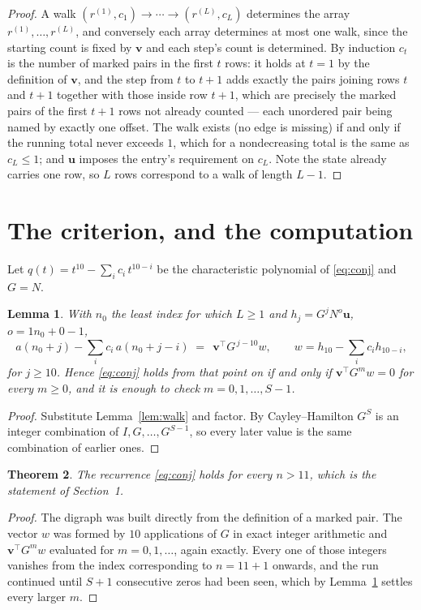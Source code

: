 \documentclass[11pt,a4paper]{article}
\theoremstyle{plain}
\newtheorem{theorem}{Theorem}
\newtheorem{lemma}[theorem]{Lemma}
\theoremstyle{definition}
\begin{document}
\begin{proof}
A walk $(r^{(1)},c_1)\to\cdots\to(r^{(L)},c_L)$ determines the array
$r^{(1)},\dots,r^{(L)}$, and conversely each array determines at most one walk, since the
starting count is fixed by $\mathbf{v}$ and each step's count is determined. By induction
$c_t$ is the number of marked pairs in the first $t$ rows: it holds at $t=1$ by the
definition of $\mathbf{v}$, and the step from $t$ to $t+1$ adds exactly the pairs joining
rows $t$ and $t+1$ together with those inside row $t+1$, which are precisely the marked
pairs of the first $t+1$ rows not already counted --- each unordered pair being named by
exactly one offset. The walk exists (no edge is missing) if and only if the running total
never exceeds $1$, which for a nondecreasing total is the same as $c_L\le1$; and
$\mathbf{u}$ imposes the entry's requirement on $c_L$. Note the state already carries one
row, so $L$ rows correspond to a walk of length $L-1$.
\end{proof}

\section{The criterion, and the computation}

Let $q(t)=t^{10}-\sum_i c_i\,t^{10-i}$ be the characteristic polynomial of
\eqref{eq:conj} and $G=N$.

\begin{lemma}\label{lem:crit}
With $n_0$ the least index for which $L\ge1$ and $h_j=G^{j}N^{o}\mathbf{u}$,
$o=1n_0+0-1$,
\[
a(n_0+j)-\sum_i c_i\,a(n_0+j-i)\;=\;\,\mathbf{v}^{\!\top}G^{\,j-10}w,
\qquad w=h_{10}-\sum_i c_i h_{10-i},
\]
for $j\ge10$. Hence \eqref{eq:conj} holds from that point on if and only if
$\mathbf{v}^{\!\top}G^{m}w=0$ for every $m\ge0$, and it is enough to check
$m=0,1,\dots,S-1$.
\end{lemma}

\begin{proof}
Substitute Lemma~\ref{lem:walk} and factor. By Cayley--Hamilton $G^{S}$ is an integer
combination of $I,G,\dots,G^{S-1}$, so every later value is the same combination of earlier
ones.
\end{proof}

\begin{theorem}
The recurrence \eqref{eq:conj} holds for every $n>11$, which is the statement of
Section~1.
\end{theorem}

\begin{proof}
The digraph was built directly from the definition of a marked pair. The vector $w$ was
formed by $10$ applications of $G$ in exact integer arithmetic and
$\mathbf{v}^{\!\top}G^{m}w$ evaluated for $m=0,1,\dots$, again exactly. Every one of
those integers vanishes from the index corresponding to $n=11+1$ onwards, and the run
continued until $S+1$ consecutive zeros had been seen, which by Lemma~\ref{lem:crit}
settles every larger $m$.
\end{proof}
\end{document}
